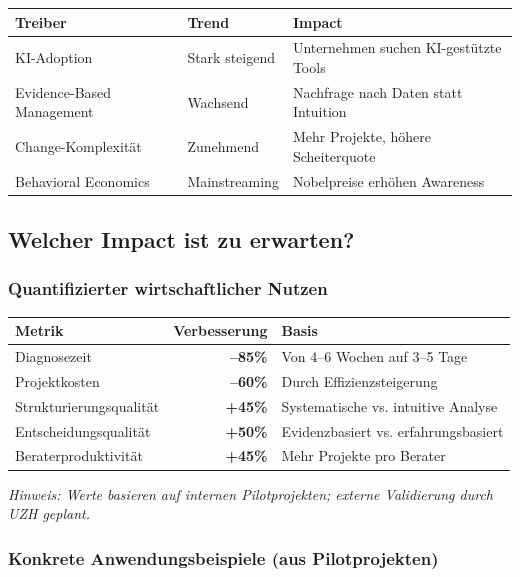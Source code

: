 \documentclass[11pt,a4paper]{article}
\begin{document}
\begin{table}[h]
\centering
\begin{tabularx}{\textwidth}{lXX}
\toprule
\textbf{Treiber} & \textbf{Trend} & \textbf{Impact} \\
\midrule
KI-Adoption & Stark steigend & Unternehmen suchen KI-gestützte Tools \\
Evidence-Based Management & Wachsend & Nachfrage nach Daten statt Intuition \\
Change-Komplexität & Zunehmend & Mehr Projekte, höhere Scheiterquote \\
Behavioral Economics & Mainstreaming & Nobelpreise erhöhen Awareness \\
\bottomrule
\end{tabularx}
\end{table}

\subsection{Welcher Impact ist zu erwarten?}

\subsubsection{Quantifizierter wirtschaftlicher Nutzen}

\begin{table}[h]
\centering
\begin{tabularx}{\textwidth}{lrX}
\toprule
\textbf{Metrik} & \textbf{Verbesserung} & \textbf{Basis} \\
\midrule
Diagnosezeit & \textbf{--85\%} & Von 4--6 Wochen auf 3--5 Tage \\
Projektkosten & \textbf{--60\%} & Durch Effizienzsteigerung \\
Strukturierungsqualität & \textbf{+45\%} & Systematische vs. intuitive Analyse \\
Entscheidungsqualität & \textbf{+50\%} & Evidenzbasiert vs. erfahrungsbasiert \\
Beraterproduktivität & \textbf{+45\%} & Mehr Projekte pro Berater \\
\bottomrule
\end{tabularx}
\end{table}

\textit{Hinweis: Werte basieren auf internen Pilotprojekten; externe Validierung durch UZH geplant.}

\subsubsection{Konkrete Anwendungsbeispiele (aus Pilotprojekten)}
\end{document}
